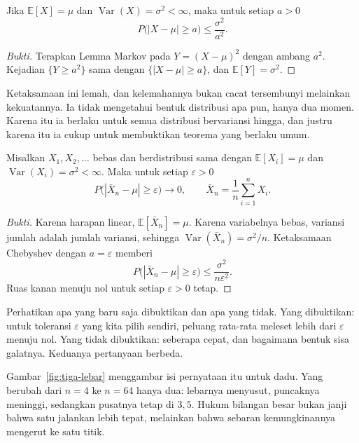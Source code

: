 \begin{akibat}
Jika $\mathbb{E}[X]=\mu$ dan $\operatorname{Var}(X)=\sigma^2<\infty$, maka untuk
setiap $a>0$
\[
P\bigl(|X-\mu|\ge a\bigr)\le\frac{\sigma^2}{a^2}.
\]
\end{akibat}

\begin{proof}[Bukti]
Terapkan Lemma Markov pada $Y=(X-\mu)^2$ dengan ambang $a^2$. Kejadian
$\{Y\ge a^2\}$ sama dengan $\{|X-\mu|\ge a\}$, dan
$\mathbb{E}[Y]=\sigma^2$.
\end{proof}

Ketaksamaan ini lemah, dan kelemahannya bukan cacat tersembunyi melainkan
kekuatannya. Ia tidak mengetahui bentuk distribusi apa pun, hanya dua momen.
Karena itu ia berlaku untuk semua distribusi bervariansi hingga, dan justru
karena itu ia cukup untuk membuktikan teorema yang berlaku umum.


\begin{teorema}
Misalkan $X_1,X_2,\dots$ bebas dan berdistribusi sama dengan
$\mathbb{E}[X_i]=\mu$ dan $\operatorname{Var}(X_i)=\sigma^2<\infty$. Maka untuk
setiap $\varepsilon>0$
\[
P\bigl(|\bar X_n-\mu|\ge\varepsilon\bigr)\to0,
\qquad \bar X_n=\frac1n\sum_{i=1}^n X_i .
\]
\end{teorema}

\begin{proof}[Bukti]
Karena harapan linear, $\mathbb{E}[\bar X_n]=\mu$. Karena variabelnya bebas,
variansi jumlah adalah jumlah variansi, sehingga
$\operatorname{Var}(\bar X_n)=\sigma^2/n$. Ketaksamaan Chebyshev dengan
$a=\varepsilon$ memberi
\[
P\bigl(|\bar X_n-\mu|\ge\varepsilon\bigr)\le\frac{\sigma^2}{n\varepsilon^2}.
\]
Ruas kanan menuju nol untuk setiap $\varepsilon>0$ tetap.
\end{proof}

Perhatikan apa yang baru saja dibuktikan dan apa yang tidak. Yang dibuktikan:
untuk toleransi $\varepsilon$ yang kita pilih sendiri, peluang rata-rata meleset
lebih dari $\varepsilon$ menuju nol. Yang tidak dibuktikan: seberapa cepat, dan
bagaimana bentuk sisa galatnya. Keduanya pertanyaan berbeda.

Gambar~\ref{fig:tiga-lebar} menggambar isi pernyataan itu untuk dadu. Yang
berubah dari $n=4$ ke $n=64$ hanya dua: lebarnya menyusut, puncaknya meninggi,
sedangkan pusatnya tetap di $3{,}5$. Hukum bilangan besar bukan janji bahwa satu
jalankan lebih tepat, melainkan bahwa sebaran kemungkinannya mengerut ke satu
titik.

